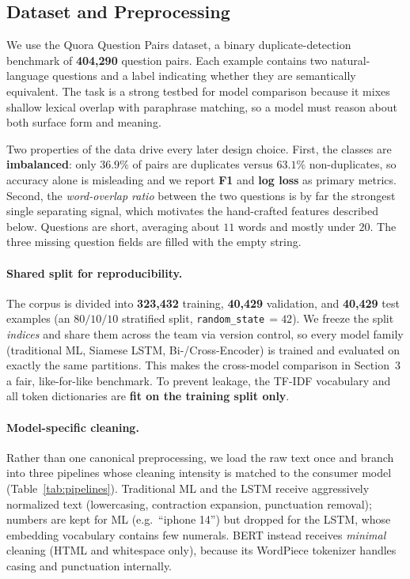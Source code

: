 
\subsection{Dataset and Preprocessing}

We use the Quora Question Pairs dataset, a binary duplicate-detection benchmark
of \textbf{404{,}290} question pairs. Each example contains two natural-language
questions and a label indicating whether they are semantically equivalent. The
task is a strong testbed for model comparison because it mixes shallow lexical
overlap with paraphrase matching, so a model must reason about both surface form
and meaning.

Two properties of the data drive every later design choice. First, the classes
are \textbf{imbalanced}: only $36.9\%$ of pairs are duplicates versus $63.1\%$
non-duplicates, so accuracy alone is misleading and we report \textbf{F1} and
\textbf{log loss} as primary metrics. Second, the \emph{word-overlap ratio}
between the two questions is by far the strongest single separating signal,
which motivates the hand-crafted features described below. Questions are short,
averaging about $11$ words and mostly under $20$. The three missing question
fields are filled with the empty string.

\paragraph{Shared split for reproducibility.}
The corpus is divided into \textbf{323{,}432} training, \textbf{40{,}429}
validation, and \textbf{40{,}429} test examples (an $80/10/10$ stratified split,
\texttt{random\_state}\,$=42$). We freeze the split \emph{indices} and share them
across the team via version control, so every model family (traditional ML,
Siamese LSTM, Bi-/Cross-Encoder) is trained and evaluated on exactly the same
partitions. This makes the cross-model comparison in Section~3 a
fair, like-for-like benchmark. To prevent leakage, the TF-IDF vocabulary and all
token dictionaries are \textbf{fit on the training split only}.

\paragraph{Model-specific cleaning.}
Rather than one canonical preprocessing, we load the raw text once and branch
into three pipelines whose cleaning intensity is matched to the consumer model
(Table~\ref{tab:pipelines}). Traditional ML and the LSTM receive aggressively
normalized text (lowercasing, contraction expansion, punctuation removal);
numbers are kept for ML (e.g.\ ``iphone 14'') but dropped for the LSTM, whose
embedding vocabulary contains few numerals. BERT instead receives \emph{minimal}
cleaning (HTML and whitespace only), because its WordPiece tokenizer handles
casing and punctuation internally.

